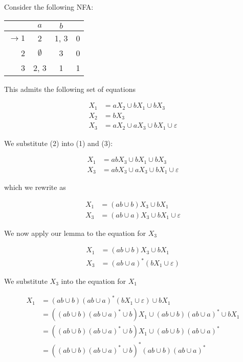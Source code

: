 Consider the following NFA:

\begin{center}\begin{tabular}{r| c c r}
      & $a$ & $b$ & \\\hline
      $\to 1$ & 2 & 1, 3 & 0\\
            2 & $\emptyset$ & 3 & 0\\
            3 & 2, 3 & 1 & 1
 \end{tabular}\end{center}

This admits the following set of equations 

\begin{align}
      X_1 &= aX_2\cup bX_1\cup bX_3\\
      X_2 &= bX_3\\
      X_3 &= aX_2\cup aX_3\cup bX_1\cup\varepsilon
\end{align}

We substitute (2) into (1) and (3):

\begin{align*}
      X_1 &= abX_3\cup bX_1\cup bX_3\\
      X_3 &= abX_3\cup aX_3\cup bX_1\cup\varepsilon
\end{align*}

which we rewrite as

\begin{align*}
      X_1 &= (ab\cup b)X_3\cup bX_1\\
      X_3 &= (ab\cup a)X_3\cup bX_1\cup\varepsilon
\end{align*}

We now apply our lemma to the equation for $X_3$

\begin{align*}
      X_1 &= (ab\cup b)X_3\cup bX_1\\
      X_3 &= (ab\cup a)^*(bX_1\cup\varepsilon)
\end{align*}

We substitute $X_3$ into the equation for $X_1$

\begin{align*}
      X_1&=(ab\cup b)(ab\cup a)^*(bX_1\cup\varepsilon)\cup bX_1\\
         &=\left((ab\cup b)(ab\cup a)^*\cup b\right)X_1\cup (ab\cup b)(ab\cup a)^*\cup bX_1\\
         &=\left((ab\cup b)(ab\cup a)^*\cup b\right)X_1\cup (ab\cup b)(ab\cup a)^*\\
         &=\left((ab\cup b)(ab\cup a)^*\cup b\right)^*(ab\cup b)(ab\cup a)^*
\end{align*}

